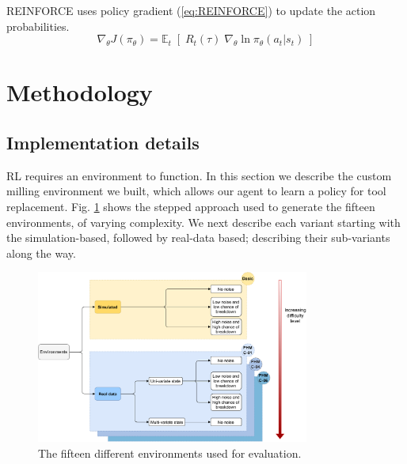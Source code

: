 \documentclass[a4paper, 12pt]{article}
\begin{document}
REINFORCE uses policy gradient (\ref{eq:REINFORCE}) to update the action probabilities.
\begin{equation}
	\nabla_ \theta J(\pi_\theta) = \mathbb{E}_t \; [ \; R_t(\tau) \; \nabla_\theta \ln \pi_\theta(a_t \vert s_t) \;]
	\label{eq:REINFORCE}
\end{equation}

\section{Methodology}\label{sec:Method}
\subsection{Implementation details}\label{sec:Implementation}
RL requires an environment to function. In this section we describe the custom milling environment we built, which allows our agent to learn a policy for tool replacement. Fig. \ref{fig:environments} shows the stepped approach used to generate the fifteen environments, of varying complexity. We next describe each variant starting with the simulation-based, followed by real-data based; describing their sub-variants along the way.
\begin{figure}[h]
	\centering
	\includegraphics[width=0.8\textwidth]{Environments.pdf}  
	\caption{The fifteen different environments used for evaluation.}
	\label{fig:environments}
\end{figure} 
\end{document}
